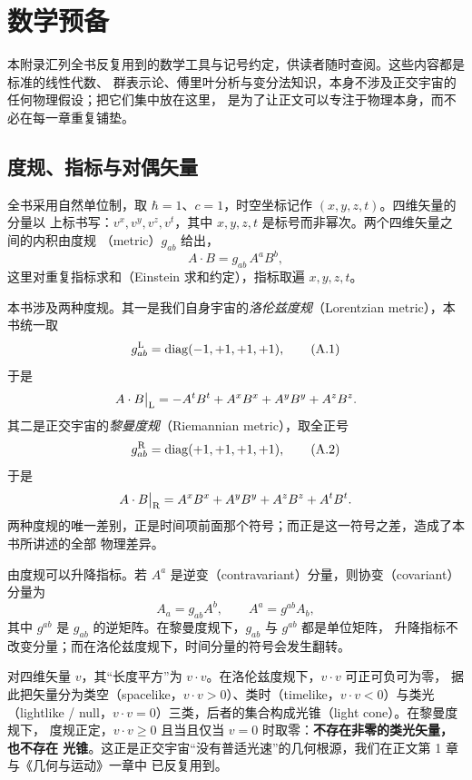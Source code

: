\chapter{数学预备}

本附录汇列全书反复用到的数学工具与记号约定，供读者随时查阅。这些内容都是标准的线性代数、
群表示论、傅里叶分析与变分法知识，本身不涉及正交宇宙的任何物理假设；把它们集中放在这里，
是为了让正文可以专注于物理本身，而不必在每一章重复铺垫。

\section{度规、指标与对偶矢量}

全书采用自然单位制，取 $\hbar=1$、$c=1$，时空坐标记作 $(x,y,z,t)$。四维矢量的分量以
上标书写：$v^x,v^y,v^z,v^t$，其中 $x,y,z,t$ 是标号而非幂次。两个四维矢量之间的内积由度规
（metric）$g_{ab}$ 给出，
\begin{equation}
A\cdot B = g_{ab}\,A^a B^b ,
\end{equation}
这里对重复指标求和（Einstein 求和约定），指标取遍 $x,y,z,t$。

本书涉及两种度规。其一是我们自身宇宙的\emph{洛伦兹度规}（Lorentzian metric），本书统一取
\begin{equation}
g^{\mathrm{L}}_{ab}=\operatorname{diag}(-1,+1,+1,+1),
\tag{A.1}
\end{equation}
于是
\begin{equation}
A\cdot B \big|_{\mathrm{L}} = -A^t B^t + A^x B^x + A^y B^y + A^z B^z .
\end{equation}
其二是正交宇宙的\emph{黎曼度规}（Riemannian metric），取全正号
\begin{equation}
g^{\mathrm{R}}_{ab}=\operatorname{diag}(+1,+1,+1,+1),
\tag{A.2}
\end{equation}
于是
\begin{equation}
A\cdot B \big|_{\mathrm{R}} = A^x B^x + A^y B^y + A^z B^z + A^t B^t .
\end{equation}
两种度规的唯一差别，正是时间项前面那个符号；而正是这一符号之差，造成了本书所讲述的全部
物理差异。

由度规可以升降指标。若 $A^a$ 是逆变（contravariant）分量，则协变（covariant）分量为
\begin{equation}
A_a = g_{ab} A^b ,\qquad A^a = g^{ab} A_b ,
\end{equation}
其中 $g^{ab}$ 是 $g_{ab}$ 的逆矩阵。在黎曼度规下，$g_{ab}$ 与 $g^{ab}$ 都是单位矩阵，
升降指标不改变分量；而在洛伦兹度规下，时间分量的符号会发生翻转。

对四维矢量 $v$，其“长度平方”为 $v\cdot v$。在洛伦兹度规下，$v\cdot v$ 可正可负可为零，
据此把矢量分为类空（spacelike，$v\cdot v>0$）、类时（timelike，$v\cdot v<0$）与类光
（lightlike / null，$v\cdot v=0$）三类，后者的集合构成光锥（light cone）。在黎曼度规下，
度规正定，$v\cdot v\ge 0$ 且当且仅当 $v=0$ 时取零：\textbf{不存在非零的类光矢量，也不存在
光锥}。这正是正交宇宙“没有普适光速”的几何根源，我们在正文第 1 章与《几何与运动》一章中
已反复用到。

